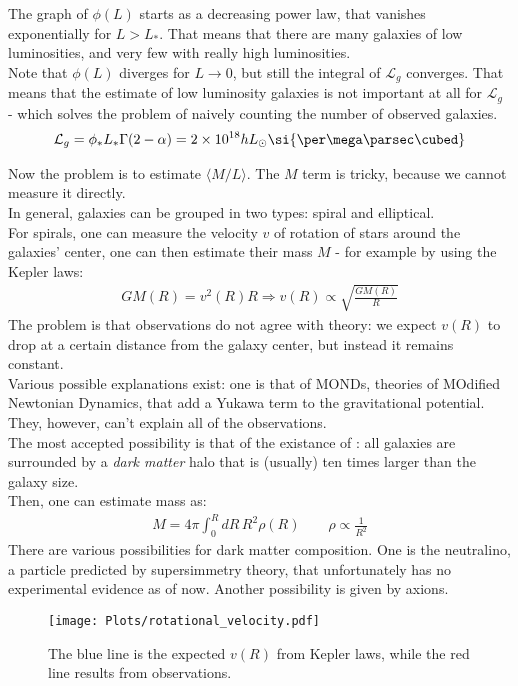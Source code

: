 \documentclass[../PhysUniverse.tex]{subfiles}
\begin{document}
The graph of $\phi(L)$ starts as a decreasing power law, that vanishes exponentially for $L>L_*$. That means that there are many galaxies of low luminosities, and very few with really high luminosities.\\
Note that $\phi(L)$ diverges for $L\to 0$, but still the integral of $\mathcal{L}_g$ converges. That means that the estimate of low luminosity galaxies is not important at all for $\mathcal{L}_g$ - which solves the problem of naively counting the number of observed galaxies.
\begin{align*}
\mathcal{L}_g = \phi_* L_* \Gamma(2-\alpha) = 2\times 10^{18}h L_\odot \si{\per\mega\parsec\cubed}
\end{align*}

Now the problem is to estimate $\langle M/L\rangle$. The $M$ term is tricky, because we cannot measure it directly.\\
In general, galaxies can be grouped in two types: spiral and elliptical.\\

For spirals, one can measure the velocity $v$ of rotation of stars around the galaxies' center, one can then estimate their mass $M$ - for example by using the Kepler laws:
\begin{align*}
GM(R) = v^2(R)R \Rightarrow v(R) \propto \sqrt{\frac{GM(R)}{R}}
\end{align*}
The problem is that observations do not agree with theory: we expect $v(R)$ to drop at a certain distance from the galaxy center, but instead it remains constant.\\
Various possible explanations exist: one is that of MONDs, theories of MOdified Newtonian Dynamics, that add a Yukawa term to the gravitational potential. They, however, can't explain all of the observations.\\
The most accepted possibility is that of the existance of : all galaxies are surrounded by a \textit{dark matter} halo that is (usually) ten times larger than the galaxy size.\\
Then, one can estimate mass as:
\begin{align*}
M = 4\pi \int_0^R dR\, R^2 \rho(R)\qquad \rho \propto \frac{1}{R^2}
\end{align*}
There are various possibilities for dark matter composition. One is the neutralino, a particle predicted by supersimmetry theory, that unfortunately has no experimental evidence as of now. Another possibility is given by axions.


\begin{figure}[H]
\begin{centering}
\texttt{[image: Plots/rotational\_velocity.pdf]}
\caption{The blue line is the expected $v(R)$ from Kepler laws, while the red line results from observations.}
\end{centering}
\end{figure}
\end{document}
